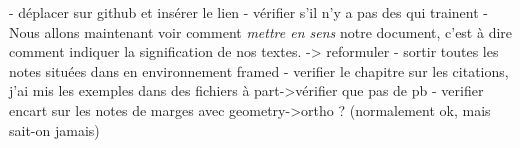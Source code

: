 - déplacer sur github et insérer le lien
- vérifier s'il n'y a pas des  qui trainent
- Nous allons maintenant voir comment \emph{mettre en sens} notre document, c'est à dire comment indiquer  la signification de nos textes. -> reformuler
- sortir toutes les notes situées dans en environnement framed
- verifier le chapitre sur les citations, j'ai mis les exemples dans des fichiers à part->vérifier que pas de pb
- verifier encart sur les notes de marges avec geometry->ortho ? (normalement ok, mais sait-on jamais)